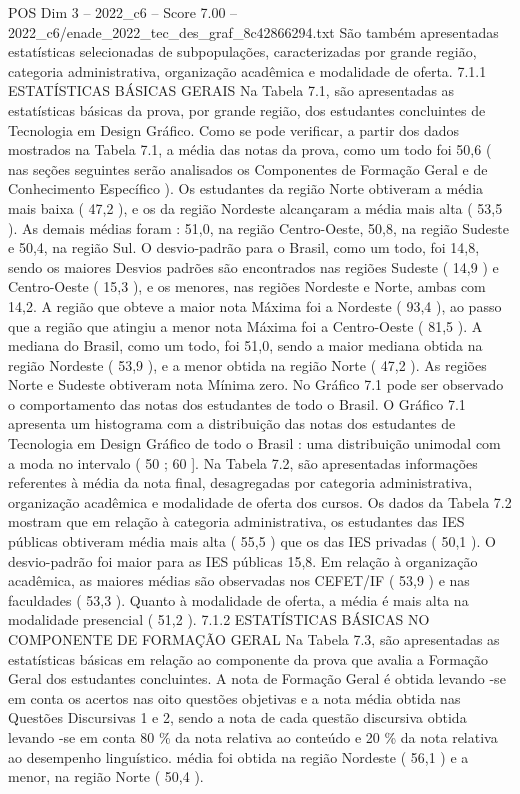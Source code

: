 \begin{textsample}{POS Dim 3 – 2022\_c6 – Score 7.00 – 2022\_c6/enade\_2022\_tec\_des\_graf\_8c42866294.txt}
São também apresentadas estatísticas selecionadas de subpopulações, caracterizadas por grande região, categoria administrativa, organização acadêmica e modalidade de oferta. 7.1.1 ESTATÍSTICAS BÁSICAS GERAIS Na Tabela 7.1, são apresentadas as estatísticas básicas da prova, por grande região, dos estudantes concluintes de Tecnologia em Design Gráfico.
Como se pode verificar, a partir dos dados mostrados na Tabela 7.1, a média das notas da prova, como um todo foi 50,6 ( nas seções seguintes serão analisados os Componentes de Formação Geral e de Conhecimento Específico ).
Os estudantes da região Norte obtiveram a média mais baixa ( 47,2 ), e os da região Nordeste alcançaram a média mais alta ( 53,5 ).
As demais médias foram : 51,0, na região Centro-Oeste, 50,8, na região Sudeste e 50,4, na região Sul.
O desvio-padrão para o Brasil, como um todo, foi 14,8, sendo os maiores Desvios padrões são encontrados nas regiões Sudeste ( 14,9 ) e Centro-Oeste ( 15,3 ), e os menores, nas regiões Nordeste e Norte, ambas com 14,2.
A região que obteve a maior nota Máxima foi a Nordeste ( 93,4 ), ao passo que a região que atingiu a menor nota Máxima foi a Centro-Oeste ( 81,5 ).
A mediana do Brasil, como um todo, foi 51,0, sendo a maior mediana obtida na região Nordeste ( 53,9 ), e a menor obtida na região Norte ( 47,2 ).
As regiões Norte e Sudeste obtiveram nota Mínima zero.
No Gráfico 7.1 pode ser observado o comportamento das notas dos estudantes de todo o Brasil.
O Gráfico 7.1 apresenta um histograma com a distribuição das notas dos estudantes de Tecnologia em Design Gráfico de todo o Brasil : uma distribuição unimodal com a moda no intervalo ( 50 ; 60 ].
Na Tabela 7.2, são apresentadas informações referentes à média da nota final, desagregadas por categoria administrativa, organização acadêmica e modalidade de oferta dos cursos.
Os dados da Tabela 7.2 mostram que em relação à categoria administrativa, os estudantes das IES públicas obtiveram média mais alta ( 55,5 ) que os das IES privadas ( 50,1 ).
O desvio-padrão foi maior para as IES públicas 15,8.
Em relação à organização acadêmica, as maiores médias são observadas nos CEFET/IF ( 53,9 ) e nas faculdades ( 53,3 ).
Quanto à modalidade de oferta, a média é mais alta na modalidade presencial ( 51,2 ). 7.1.2 ESTATÍSTICAS BÁSICAS NO COMPONENTE DE FORMAÇÃO GERAL Na Tabela 7.3, são apresentadas as estatísticas básicas em relação ao componente da prova que avalia a Formação Geral dos estudantes concluintes.
A nota de Formação Geral é obtida levando -se em conta os acertos nas oito questões objetivas e a nota média obtida nas Questões Discursivas 1 e 2, sendo a nota de cada questão discursiva obtida levando -se em conta 80 \% da nota relativa ao conteúdo e 20 \% da nota relativa ao desempenho linguístico. média foi obtida na região Nordeste ( 56,1 ) e a menor, na região Norte ( 50,4 ).

\end{textsample}

